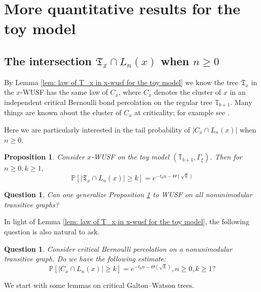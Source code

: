 \documentclass[12pt]{article}
\newtheorem{proposition}[theorem]{Proposition}
\newtheorem{question}[theorem]{Question}
\numberwithin{equation}{section}
\newcommand{\be}{\begin{equation}}
\newcommand{\ee}{\end{equation}}
\newcommand{\1}{\mathbf{1}}
\begin{document}
\section{More quantitative results for the toy model}\label{sec: section C in the appendix}


 \subsection{The intersection  $\mathfrak{T}_x\cap L_n(x)$ when $n\geq0$}

By Lemma \ref{lem: law of T_x in  x-wusf for the toy model} we know the tree $\mathfrak{T}_x$ in the $x$-WUSF has the same law of $C_x$, where $C_x$ denotes  the cluster of $x$ in an independent critical Bernoulli bond percolation on the regular tree $\mathbb{T}_{b+1}$. Many things are known about the cluster of $C_x$ at criticality; for example see \cite[Theorem 1.6]{Tom2017}. 

Here we are particularly interested in the tail probability of $|C_x\cap L_n(x)|$ when $n\geq0$. 

\begin{proposition}\label{prop: stretched exponential decay for x-wusf intersect with L_n(x)}
	Consider $x$-WUSF on the toy model $(\mathbb{T}_{b+1},\Gamma_{\xi})$. Then for $n\geq0,k\geq1$,
	\be\label{eq: stretched exponential decay for C_x intersecting with L_n(x)}
	\mathbb{P}[|\mathfrak{T}_x\cap L_n(x)|\geq k]=e^{-t_0n-\Theta(\sqrt{k})}
	\ee
\end{proposition}


\begin{question}
	Can one generalize Proposition \ref{prop: stretched exponential decay for x-wusf intersect with L_n(x)} to WUSF on all nonunimodular transitive graphs? 
\end{question}
In light of Lemma \ref{lem: law of T_x in  x-wusf for the toy model}, the following question is also natural to ask.
\begin{question}
	Consider critical Bernoulli percolation on a nonunimodular transitive graph. Do we have the following estimate: 
	\[
		\mathbb{P}[|C_x\cap L_n(x)|\geq k]=e^{-t_0n-\Theta(\sqrt{k})},n\geq0,k\geq1?
	\]
\end{question}

We start with some lemmas on critical  Galton--Watson trees.
\end{document}
